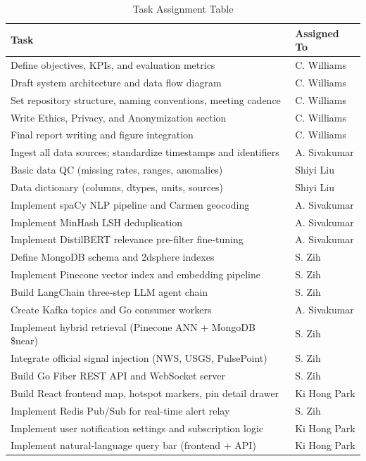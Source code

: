\documentclass[conference]{IEEEtran}
\begin{document}
\begin{table}[h]
\caption{Task Assignment Table}
\label{tab:tasks}
\renewcommand{\arraystretch}{1.2}
\begin{tabular}{p{5.0cm} p{2.5cm}}
\toprule
\textbf{Task} & \textbf{Assigned To} \\
\midrule
Define objectives, KPIs, and evaluation metrics & C. Williams \\
Draft system architecture and data flow diagram & C. Williams \\
Set repository structure, naming conventions, meeting cadence & C. Williams \\
Write Ethics, Privacy, and Anonymization section & C. Williams \\
Final report writing and figure integration & C. Williams \\
Ingest all data sources; standardize timestamps and identifiers & A. Sivakumar \\
Basic data QC (missing rates, ranges, anomalies) & Shiyi Liu \\
Data dictionary (columns, dtypes, units, sources) & Shiyi Liu \\
Implement spaCy NLP pipeline and Carmen geocoding & A. Sivakumar \\
Implement MinHash LSH deduplication & A. Sivakumar \\
Implement DistilBERT relevance pre-filter fine-tuning & A. Sivakumar \\
Define MongoDB schema and 2dsphere indexes & S. Zih \\
Implement Pinecone vector index and embedding pipeline & S. Zih \\
Build LangChain three-step LLM agent chain & S. Zih \\
Create Kafka topics and Go consumer workers & A. Sivakumar \\
Implement hybrid retrieval (Pinecone ANN + MongoDB \$near) & S. Zih \\
Integrate official signal injection (NWS, USGS, PulsePoint) & S. Zih \\
Build Go Fiber REST API and WebSocket server & S. Zih \\
Build React frontend map, hotspot markers, pin detail drawer & Ki Hong Park \\
Implement Redis Pub/Sub for real-time alert relay & S. Zih \\
Implement user notification settings and subscription logic & Ki Hong Park \\
Implement natural-language query bar (frontend + API) & Ki Hong Park \\

\end{tabular}
\end{table}
\end{document}
